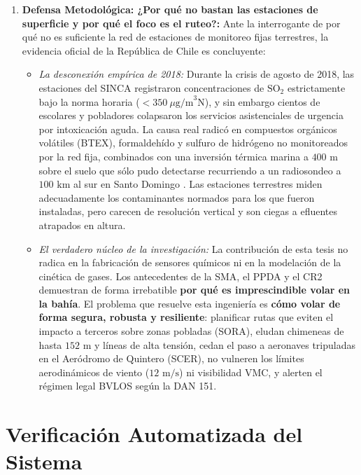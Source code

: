 \documentclass[letterpaper,12pt]{article}
\begin{document}
\begin{enumerate}
    \item \textbf{Defensa Metodológica: ¿Por qué no bastan las estaciones de superficie y por qué el foco es el ruteo?:} Ante la interrogante de por qué no es suficiente la red de estaciones de monitoreo fijas terrestres, la evidencia oficial de la República de Chile es concluyente:
    \begin{itemize}
        \item \textit{La desconexión empírica de 2018:} Durante la crisis de agosto de 2018, las estaciones del SINCA registraron concentraciones de $\text{SO}_2$ estrictamente bajo la norma horaria ($<350\ \mu\text{g/m}^3\text{N}$), y sin embargo cientos de escolares y pobladores colapsaron los servicios asistenciales de urgencia por intoxicación aguda. La causa real radicó en compuestos orgánicos volátiles (BTEX), formaldehído y sulfuro de hidrógeno no monitoreados por la red fija, combinados con una inversión térmica marina a $400\text{ m}$ sobre el suelo que sólo pudo detectarse recurriendo a un radiosondeo a $100\text{ km}$ al sur en Santo Domingo \cite{sma_dictuc}. Las estaciones terrestres miden adecuadamente los contaminantes normados para los que fueron instaladas, pero carecen de resolución vertical y son ciegas a efluentes atrapados en altura.
        \item \textit{El verdadero núcleo de la investigación:} La contribución de esta tesis no radica en la fabricación de sensores químicos ni en la modelación de la cinética de gases. Los antecedentes de la SMA, el PPDA y el CR2 demuestran de forma irrebatible \textbf{por qué es imprescindible volar en la bahía}. El problema que resuelve esta ingeniería es \textbf{cómo volar de forma segura, robusta y resiliente}: planificar rutas que eviten el impacto a terceros sobre zonas pobladas (SORA), eludan chimeneas de hasta $152\text{ m}$ y líneas de alta tensión, cedan el paso a aeronaves tripuladas en el Aeródromo de Quintero (SCER), no vulneren los límites aerodinámicos de viento ($12\text{ m/s}$) ni visibilidad VMC, y alerten el régimen legal BVLOS según la DAN 151.
    \end{itemize}
\end{enumerate}

\section{Verificación Automatizada del Sistema}
\label{sec:verificacion}
\end{document}
